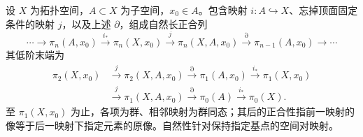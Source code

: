 \begin{theorem}[空间对的同伦序列]\label{g2:thm:pair-homotopy-sequence}
	设 \(X\) 为拓扑空间，\(A\subset X\) 为子空间，\(x_0\in A\)。包含映射 \(i:A\hookrightarrow X\)、忘掉顶面固定条件的映射 \(j\)，以及上述 \(\partial\)，组成自然长正合列
	\[
		\cdots\longrightarrow\pi_n(A,x_0)\xrightarrow{i_*}\pi_n(X,x_0)
		\xrightarrow{j}\pi_n(X,A,x_0)\xrightarrow{\partial}\pi_{n-1}(A,x_0)
		\longrightarrow\cdots
	\]
	其低阶末端为
	\begin{align*}
		\pi_2(X,x_0)&\xrightarrow{j}\pi_2(X,A,x_0)\xrightarrow{\partial}\pi_1(A,x_0)
		\xrightarrow{i_*}\pi_1(X,x_0)\\
		&\xrightarrow{j}\pi_1(X,A,x_0)\xrightarrow{\partial}\pi_0(A)
		\xrightarrow{i_*}\pi_0(X).
	\end{align*}
	至 \(\pi_1(X,x_0)\) 为止，各项为群、相邻映射为群同态；其后的正合性指前一映射的像等于后一映射下指定元素的原像。自然性针对保持指定基点的空间对映射。
\end{theorem}
